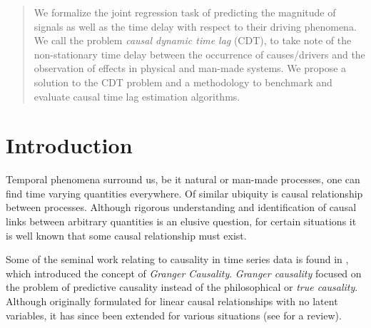 \documentclass[twoside]{article}
\begin{document}
%

%


\begin{abstract}
  We formalize the joint regression task of predicting the magnitude of signals as well as the time delay with respect to their driving phenomena. We call the problem \emph{causal dynamic time lag} (CDT), to take note of the non-stationary time delay between the occurrence of causes/drivers and the observation of effects in physical and man-made systems. We propose a solution to the CDT problem and a methodology to benchmark and evaluate causal time lag estimation algorithms.
\end{abstract}

\section{Introduction}

Temporal phenomena surround us, be it natural or man-made processes, one can find time varying quantities everywhere. Of similar ubiquity is causal relationship between processes. Although rigorous understanding and identification of causal links between arbitrary quantities is an elusive question, for certain situations it is well known that some causal relationship must exist. 

Some of the seminal work relating to causality in time series data is found in \cite{Granger}, which introduced the concept of \emph{Granger Causality}. \emph{Granger causality} focused on the problem of predictive causality instead of the philosophical or \emph{true causality}. Although originally formulated for linear causal relationships with no latent variables, it has since been extended for various situations (see \cite{doi:10.1002/9781119945710.ch22} for a review).
\end{document}
